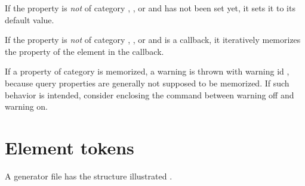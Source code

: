 \documentclass{tufte-handout}
\begin{document}
If the property is \emph{not} of category , , or  and has not been set yet, it sets it to its default value.
 
If the property is \emph{not} of category , , or  and is a callback, it iteratively memorizes the property of the element in the callback.
 
If a property of category  is memorized, a warning is thrown with warning id , because query properties are generally not supposed to be memorized. If such behavior is intended, consider enclosing the command between warning off and warning on.

\section{Element tokens}

A generator file has the structure illustrated .
\end{document}
